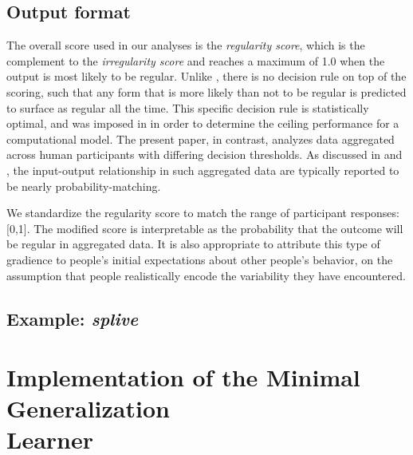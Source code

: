 \documentclass[12pt]{article}
\begin{document}
\subsection{Output format}

The overall score used in our analyses is the {\em regularity score}, which is the complement to the {\em irregularity score} and reaches a maximum of 1.0 when the output is most likely to be regular. Unlike \cite{dawdy2014learnability}, there is no decision rule on top of the scoring, such that any form that is more likely than not to be regular is predicted to surface as regular all the time. This specific decision rule is statistically optimal, and was imposed in \cite{dawdy2014learnability} in order to determine the ceiling performance for a computational model. The present paper, in contrast, analyzes data aggregated across human participants with differing decision thresholds. As discussed in \cite{schumacher2014reconciling} and \cite{schumacher2017prior}, the input-output relationship in such aggregated data are typically reported to be nearly probability-matching. 

We standardize the regularity score to match the range of participant responses: [0,1]. The modified score is interpretable as the probability that the outcome will be regular in aggregated data. It is also appropriate to attribute this type of gradience to people's initial expectations about other people's behavior, on the assumption that people realistically encode the variability they have encountered.

\subsection{Example: {\em splive}}



\section{Implementation of the Minimal Generalization \\ Learner}\label{appendixmgl}
\end{document}
